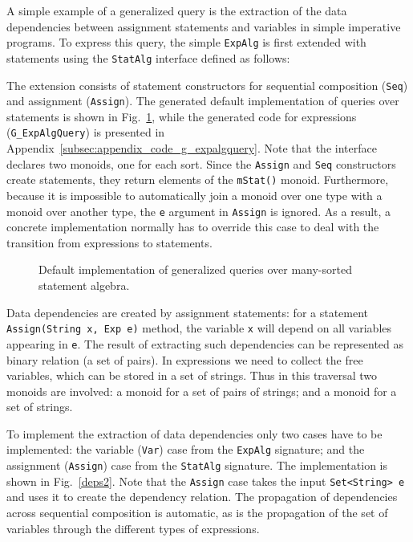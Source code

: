 A simple example of a generalized query is the extraction of the data
dependencies between assignment statements and variables in simple
imperative programs.  To express this query, the simple
\lstinline{ExpAlg} is first extended with statements using the
\lstinline{StatAlg} interface defined as follows:


The extension consists of statement constructors for sequential composition
(\lstinline{Seq}) and assignment (\lstinline{Assign}).  The generated
default implementation of queries over statements is shown in
Fig.~\ref{LST:gstatquery}, while the generated code for expressions (\lstinline{G_ExpAlgQuery}) is
presented in Appendix~\ref{subsec:appendix_code_g_expalgquery}.  Note that the interface declares two
monoids, one for each sort.  Since the \lstinline{Assign} and
\lstinline{Seq} constructors create statements, they return elements
of the \lstinline{mStat()} monoid.  Furthermore, because it is
impossible to automatically join a monoid over one type with a monoid
over another type, the \lstinline{e} argument in \lstinline{Assign}
is ignored.  As a result, a
concrete implementation normally has to override this case to deal with the
transition from expressions to statements.

\begin{figure}[t]
\nocaptionrule
\caption{Default implementation of generalized queries over many-sorted statement algebra.}
\label{LST:gstatquery}
\end{figure}



Data dependencies are created by assignment statements: for a
statement \lstinline{Assign(String x, Exp e)} method, the variable
\lstinline{x} will depend on all variables appearing in \lstinline{e}.
The result of extracting such dependencies can be represented as
binary relation (a set of pairs). In expressions we need to collect
the free variables, which can be stored in a set of strings.  Thus in
this traversal two monoids are involved: a monoid for a set of pairs
of strings; and a monoid for a set of strings.

To implement the extraction of data dependencies only two cases have to
be implemented: the variable (\lstinline{Var}) case from the
\lstinline{ExpAlg} signature; and the assignment (\lstinline{Assign})
case from the \lstinline{StatAlg} signature.  The implementation is
shown in Fig.~\ref{deps2}.  Note that the \lstinline{Assign} case takes
the input \lstinline{Set<String> e} and uses it to create the
dependency relation.  The propagation of dependencies across
sequential composition is automatic, as is the propagation of the set
of variables through the different types of expressions.


